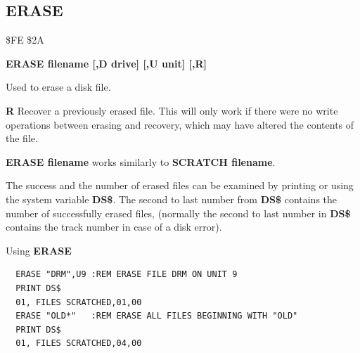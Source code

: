 
\newpage
\subsection{ERASE}
\label{erasecommand}
\begin{description}[leftmargin=2cm,style=nextline]
\item [Token:] \$FE \$2A
\item [Format:] {\bf ERASE filename [,D drive] [,U unit] [,R]}
\item [Usage:] Used
               to erase a disk file.

   \filenamedefinition

   \drivedefinition

   \unitdefinition

   {\bf R} Recover a previously erased file.
   This will only work if there were no write operations
   between erasing and recovery, which may have altered the
   contents of the file.

\item [Remarks:] {\bf ERASE filename} works similarly to {\bf SCRATCH filename}.

                 The success and the number of erased files can
                 be examined by printing or using the system
                 variable {\bf DS\$}. The second to last number from {\bf DS\$}
                 contains the number of successfully erased files,
                 (normally the second to last number in {\bf DS\$}
                 contains the track number in case of a disk error).

\item [Examples:] Using {\bf ERASE}
\begin{tcolorbox}[colback=black,coltext=white]
\verbatimfont{\codefont}
\begin{verbatim}
  ERASE "DRM",U9 :REM ERASE FILE DRM ON UNIT 9
  PRINT DS$
  01, FILES SCRATCHED,01,00
  ERASE "OLD*"   :REM ERASE ALL FILES BEGINNING WITH "OLD"
  PRINT DS$
  01, FILES SCRATCHED,04,00
\end{verbatim}
\end{tcolorbox}
\end{description}


\newpage
